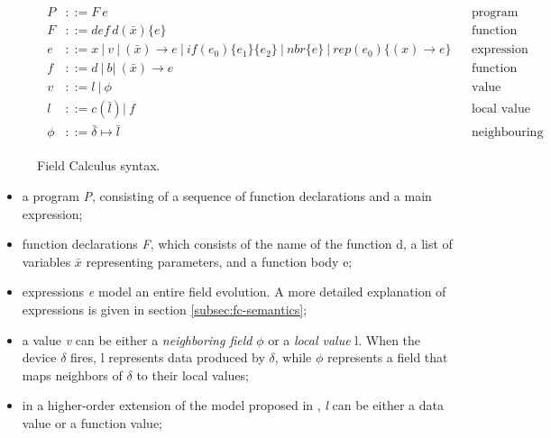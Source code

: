 \begin{figure}
    \begin{align*}
        \boxed{
            \begin{aligned}
                P    & ::= F\ e                                                                                                                   &  & \text{program}                  \\
                F    & ::= def \, d(\bar{x}) \{e\}                                                                                                &  & \text{function declaration}     \\
                e    & ::= x \ | \ v \ | \ (\bar{x}) \rightarrow e \ | \ if(e_0)\{e_1\}\{e_2\} \ | \ nbr\{e\} \ | \ rep(e_0)\{(x) \rightarrow e\} &  & \text{expression}               \\
                f    & ::= d \ | \ b    | \     (\bar{x}) \rightarrow e                                                                           &  & \text{function name}            \\
                v    & ::= l \ | \ \phi                                                                                                           &  & \text{value}                    \\
                l    & ::= c(\bar{l})     | \ f                                                                                                   &  & \text{local value}              \\
                \phi & ::= \bar{\delta} \mapsto \bar{l}                                                                                           &  & \text{neighbouring field value}
            \end{aligned}
        }
    \end{align*}
    \caption{Field Calculus syntax\cite{10.1145/3285956}.}
    \label{fig:fc-syntax}
\end{figure}

\begin{itemize}
    \item a program \textit{P}, consisting of a sequence of function declarations and a main expression;
    \item function declarations \textit{F}, which consists of the name of the function d, a list of variables $\bar{x}$ representing parameters, and a function body e;
    \item expressions \textit{e} model an entire field evolution. A more detailed explanation of expressions is given in section \ref{subsec:fc-semantics};
    \item a value \textit{v} can be either a \textit{neighboring field} $\phi$ or a \textit{local value} l. When the device $\delta$ fires, l represents data produced by $\delta$, while $\phi$ represents a field that maps neighbors of $\delta$ to their local values;
    \item in a higher-order extension of the model proposed in \cite{10.1145/3285956}, \textit{l} can be either a data value or a function value;
\end{itemize}

